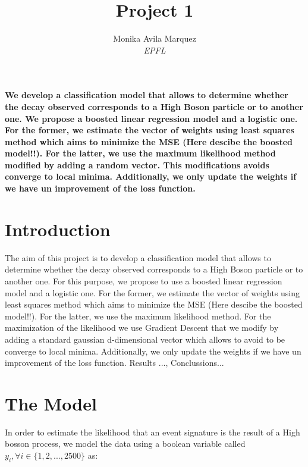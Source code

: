 \documentclass[10pt,conference,compsocconf]{IEEEtran}
\begin{document}
\title{Project 1}

\author{
  Monika Avila Marquez \\
  \textit{EPFL}
}

\maketitle

\begin{abstract}
  
\end{abstract}	\textbf{We develop a classification model that allows to determine whether the decay observed corresponds to a High Boson particle or to another one. We propose a boosted linear regression model and a logistic one. For the former, we estimate the vector of weights using least squares method which aims to minimize the MSE (Here descibe the boosted model!!). For the latter, we use the maximum likelihood method modified by adding a random vector. This modifications avoids converge to local minima. Additionally, we only update the weights if we have un improvement of the loss function. }

\section{Introduction}

The aim of this project is to develop a classification model that allows to determine whether the decay observed corresponds to a High Boson particle or to another one. For this purpose, we propose to use a  boosted linear regression model and a logistic one. For the former, we estimate the vector of weights using least squares method which aims to minimize the MSE (Here descibe the boosted model!!). For the latter, we use the maximum likelihood method. For the maximization of the likelihood we use Gradient Descent that we modify by adding a standard gaussian d-dimensional vector which allows to avoid to be converge to local minima. Additionally, we only update the weights if we have un improvement of the loss function.
Results ..., Conclussions...
\section{The Model}
\label{S1}
In order to estimate the likelihood that an event signature is the result of a High bosson process, we model the data using a boolean variable called $y_i, \forall i \in  \{1, 2, ..., 2500\}  $ as:
\end{document}
